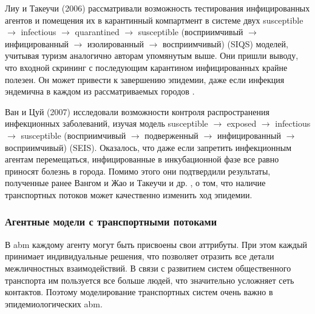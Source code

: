 \documentclass[a4paper,12pt]{article} %
\begin{document}
Лиу и Такеучи (2006) \cite{liu2006spread} рассматривали возможность тестирования инфицированных агентов и помещения их в карантинный компартмент в системе двух susceptible $\rightarrow$ infectious $\rightarrow$ quarantined $\rightarrow$ susceptible (восприимчивый $\rightarrow$ инфицированный $\rightarrow$ изолированный $\rightarrow$ восприимчивый) (SIQS) моделей, учитывая туризм аналогично авторам упомянутым выше. Они пришли выводу, что входной скрининг с последующим карантином инфицированных крайне полезен. Он может привести к завершению эпидемии, даже если инфекция эндемична в каждом из рассматриваемых городов \cite{liu2006spread}.

Ван и Цуй (2007) \cite{wan2007seis} исследовали возможности контроля распространения инфекционных заболеваний, изучая модель susceptible $\rightarrow$ exposed $\rightarrow$ infectious $\rightarrow$ susceptible (восприимчивый $\rightarrow$ подверженный $\rightarrow$ инфицированный $\rightarrow$ восприимчивый) (SEIS). Оказалось, что даже если запретить инфекционным агентам перемещаться, инфицированные в инкубационной фазе все равно приносят болезнь в города.                                                                                                                                                                                                                                                                                                                          Помимо этого они подтвердили результаты, полученные ранее Вангом и Жао \cite{wang2004epidemic} и Такеучи и др. \cite{takeuchi2006spreading}, о том, что наличие транспортных потоков может качественно изменить ход эпидемии.


\subsubsection{Агентные модели с транспортными потоками}
В \gls{abm} каждому агенту могут быть присвоены свои аттрибуты. При этом каждый принимает индивидуальные решения, что позволяет отразить все детали межличностных взаимодействий. В связи с развитием систем общественного транспорта им пользуется все больше людей, что значительно усложняет сеть контактов. Поэтому моделирование транспортных систем очень важно в эпидемиологических \gls{abm}.
\end{document}
